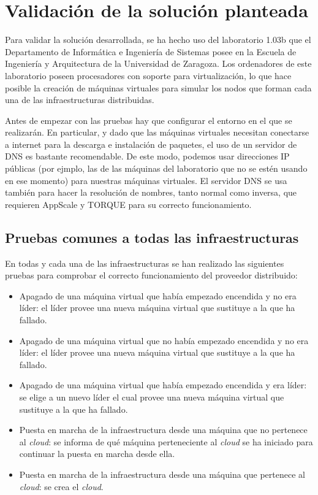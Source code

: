 \chapter{Validación de la solución planteada}
\label{cap:validacion}


Para validar la solución desarrollada, se ha hecho uso del laboratorio 1.03b que el Departamento de Informática e Ingeniería de Sistemas posee en la Escuela de Ingeniería y Arquitectura de la Universidad de Zaragoza. Los ordenadores de este laboratorio poseen procesadores con soporte para virtualización, lo que hace posible la creación de máquinas virtuales para simular los nodos que forman cada una de las infraestructuras distribuidas.

Antes de empezar con las pruebas hay que configurar el entorno en el que se realizarán. En particular, y dado que las máquinas virtuales necesitan conectarse a internet para la descarga e instalación de paquetes, el uso de un servidor de DNS es bastante recomendable. De este modo, podemos usar direcciones IP públicas (por ejmplo, las de las máquinas del laboratorio que no se estén usando en ese momento) para nuestras máquinas virtuales. El servidor DNS se usa también para hacer la resolución de nombres, tanto normal como inversa, que requieren AppScale y TORQUE para su correcto funcionamiento.


\section{Pruebas comunes a todas las infraestructuras}

En todas y cada una de las infraestructuras se han realizado las siguientes pruebas para comprobar el correcto funcionamiento del proveedor distribuido:

\begin{itemize}
\item Apagado de una máquina virtual que había empezado encendida y no era líder: el líder provee una nueva máquina virtual que sustituye a la que ha fallado.
\item Apagado de una máquina virtual que no había empezado encendida y no era líder: el líder provee una nueva máquina virtual que sustituye a la que ha fallado.
\item Apagado de una máquina virtual que había empezado encendida y era líder: se elige a un nuevo líder el cual provee una nueva máquina virtual que sustituye a la que ha fallado.
\item Puesta en marcha de la infraestructura desde una máquina que no pertenece al \emph{cloud}: se informa de qué máquina perteneciente al \emph{cloud} se ha iniciado para continuar la puesta en marcha desde ella.
\item Puesta en marcha de la infraestructura desde una máquina que pertenece al \emph{cloud}: se crea el \emph{cloud}.
\end{itemize}

